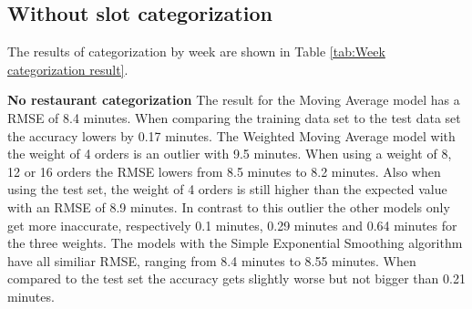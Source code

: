 \subsection{Without slot categorization}
The results of categorization by week are shown in Table \ref{tab:Week categorization result}.
\begin{table}[h]
\centering
\caption{Week categorization without slots}
\label{tab:Week categorization result}
\end{table}
\newline\newline\textbf{No restaurant categorization}\newline
The result for the Moving Average model has a RMSE of 8.4 minutes. When comparing the training data set to the test data set the accuracy lowers by 0.17 minutes. The Weighted Moving Average model with the weight of 4 orders is an outlier with 9.5 minutes. When using a weight of 8, 12 or 16 orders the RMSE lowers from 8.5 minutes to 8.2 minutes. Also when using the test set, the weight of 4 orders is still higher than the expected value with an RMSE of 8.9 minutes. In contrast to this outlier the other models only get more inaccurate, respectively 0.1 minutes, 0.29 minutes and 0.64 minutes for the three weights. The models with the Simple Exponential Smoothing algorithm have all similiar RMSE, ranging from 8.4 minutes to 8.55 minutes. When compared to the test set the accuracy gets slightly worse but not bigger than 0.21 minutes.\newline
